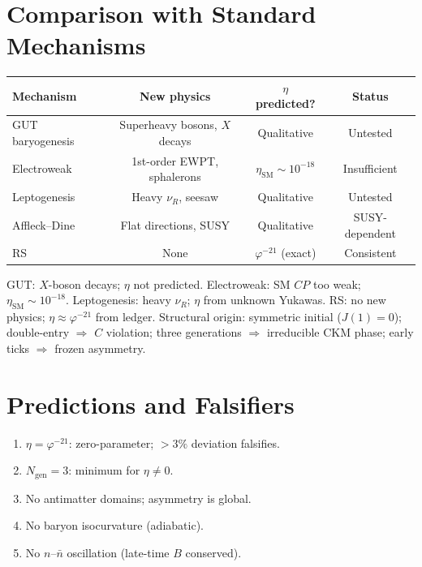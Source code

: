 \documentclass[12pt,a4paper]{article}
\theoremstyle{definition}
\theoremstyle{remark}
\begin{document}
\section{Comparison with Standard Mechanisms}
\label{sec:comparison}

\begin{center}
\renewcommand{\arraystretch}{1.3}
\begin{tabular}{lccc}
\hline
\textbf{Mechanism} & \textbf{New physics} &
\textbf{$\eta$ predicted?} & \textbf{Status} \\
\hline
GUT baryogenesis & Superheavy bosons, $X$ decays & Qualitative & Untested \\
Electroweak & 1st-order EWPT, sphalerons & $\eta_{\mathrm{SM}} \sim 10^{-18}$ & Insufficient \\
Leptogenesis & Heavy $\nu_R$, seesaw & Qualitative & Untested \\
Affleck--Dine & Flat directions, SUSY & Qualitative & SUSY-dependent \\
RS & None & $\varphi^{-21}$ (exact) & Consistent \\
\hline
\end{tabular}
\end{center}

GUT: $X$-boson decays; $\eta$ not predicted.  Electroweak: SM $CP$
too weak; $\eta_{\mathrm{SM}} \sim 10^{-18}$.  Leptogenesis: heavy
$\nu_R$; $\eta$ from unknown Yukawas.  RS: no new physics; $\eta
\approx \varphi^{-21}$ from ledger.  Structural origin: symmetric
initial ($J(1) = 0$); double-entry $\Rightarrow$ $C$ violation;
three generations $\Rightarrow$ irreducible CKM phase; early ticks
$\Rightarrow$ frozen asymmetry.

\section{Predictions and Falsifiers}
\label{sec:predictions}

\begin{enumerate}
  \item $\eta = \varphi^{-21}$: zero-parameter; $> 3\%$ deviation
  falsifies.
  \item $N_{\mathrm{gen}} = 3$: minimum for $\eta \neq 0$.
  \item No antimatter domains; asymmetry is global.
  \item No baryon isocurvature (adiabatic).
  \item No $n$--$\bar{n}$ oscillation (late-time $B$ conserved).
\end{enumerate}
\end{document}
